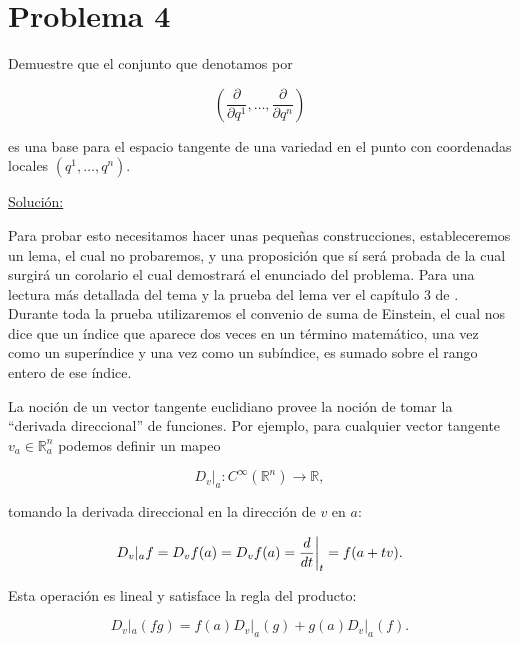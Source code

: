 \documentclass[a4paper,10pt]{article}
\numberwithin{equation}{section}
\newcommand{\zerodel}{.\kern-\nulldelimiterspace}
\begin{document}
\section{Problema 4}

Demuestre que el conjunto que denotamos por 

$$
\left( \frac{\partial}{\partial q^1},\dots, \frac{\partial}{\partial q^n}\right)
$$

es una base para el espacio tangente de una variedad en el punto con coordenadas 
locales $(q^1,\dots,q^n)$.

\vspace{.3cm}

\underline{Solución:} \vspace{.3cm}

Para probar esto necesitamos hacer unas pequeñas construcciones, estableceremos un 
lema, el cual no probaremos, y una proposición que sí será probada de la cual 
surgirá un corolario el cual demostrará el enunciado del problema. Para una lectura 
más detallada del tema y la prueba del lema ver el capítulo 3 de \cite{lee}. Durante 
toda la prueba utilizaremos el convenio de suma de Einstein, el cual nos dice 
que un índice que aparece dos veces en un término matemático, una vez como un 
superíndice y una vez como un subíndice, es sumado sobre el rango entero de ese 
índice. 

\vspace{.3cm}

La noción de un vector tangente euclidiano provee la noción de tomar la ``derivada 
direccional'' de funciones. Por ejemplo, para cualquier vector tangente $v_a \in \mathbb{R}^n_a$ 
podemos definir un mapeo 

\begin{equation}
 D_v|_a: C^{\infty}(\mathbb{R}^n) \rightarrow \mathbb{R},
\end{equation}

tomando la derivada direccional en la dirección de $v$ en $a$:

\begin{equation}
 D_v|_a f = D_v f(a) = D_v f(a) = \left\zerodel\frac{d}{dt}\right|_t= f(a+tv).
\end{equation}

Esta operación es lineal y satisface la regla del producto:

\begin{equation}
 D_v|_a (fg) = f(a)D_v|_a(g) + g(a)D_v|_a(f).
\end{equation}
\end{document}
